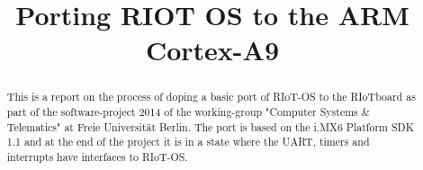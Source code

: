\documentclass[conference,a4paper]{IEEEtran}
\begin{document}
\title{Porting RIOT OS to the ARM Cortex\texttrademark-A9}

\author{
}

\maketitle

\begin{abstract}
This is a report on the process of doping a basic port of RIoT-OS to the RIoTboard as
part of the software-project 2014 of the working-group "Computer Systems \& Telematics"
at Freie Universität Berlin.
The port is based on the i.MX6 Platform SDK 1.1 and at the end of the project it is in a
state where the UART, timers and interrupts have interfaces to RIoT-OS.
\end{abstract}

\IEEEpeerreviewmaketitle





%
%
\end{document}
